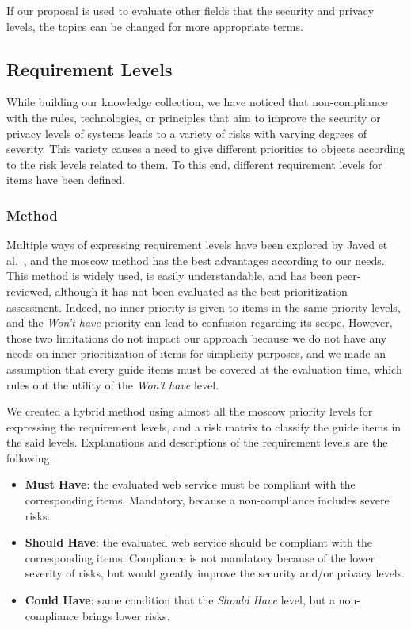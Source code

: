 If our proposal is used to evaluate other fields that the security and privacy levels, the topics can be changed for more appropriate terms.

\subsection{Requirement Levels}
\label{subsec:proposal_content_levels}

While building our knowledge collection, we have noticed that non-compliance with the rules, technologies, or principles that aim to improve the security or privacy levels of systems leads to a variety of risks with varying degrees of severity. This variety causes a need to give different priorities to objects according to the risk levels related to them. To this end, different requirement levels for items have been defined. 

\subsubsection{Method}
\label{subsec:proposal_content_levels_method}

Multiple ways of expressing requirement levels have been explored by Javed et al.~\cite{bannu_28100_pakistan_comparison_2015}, and the \gls{moscow} method has the best advantages according to our needs. This method is widely used, is easily understandable, and has been peer-reviewed, although it has not been evaluated as the best prioritization assessment. Indeed, no inner priority is given to items in the same priority levels, and the \textit{Won't have} priority can lead to confusion regarding its scope. However, those two limitations do not impact our approach because we do not have any needs on inner prioritization of items for simplicity purposes, and we made an assumption that every guide items must be covered at the evaluation time, which rules out the utility of the \textit{Won't have} level.

We created a hybrid method using almost all the \gls{moscow} priority levels for expressing the requirement levels, and a risk matrix to classify the guide items in the said levels. Explanations and descriptions of the requirement levels are the following:
\begin{itemize}
    \item \textbf{Must Have}: the evaluated web service must be compliant with the corresponding items. Mandatory, because a non-compliance includes severe risks.
    \item \textbf{Should Have}: the evaluated web service should be compliant with the corresponding items. Compliance is not mandatory because of the lower severity of risks, but would greatly improve the security and/or privacy levels.
    \item \textbf{Could Have}: same condition that the \textit{Should Have} level, but a non-compliance brings lower risks.
\end{itemize}


